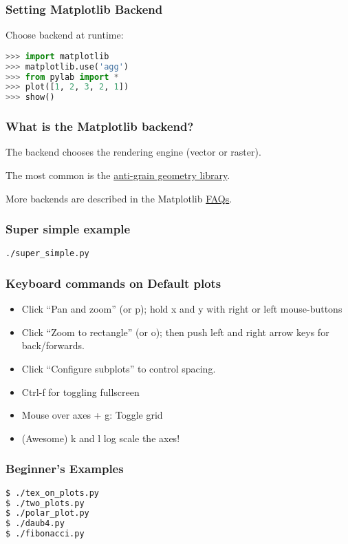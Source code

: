 \documentclass{beamer}
\begin{document}
\begin{frame}[fragile]
\frametitle{Setting Matplotlib Backend}
Choose backend at runtime:
\begin{lstlisting}[language=Python]
>>> import matplotlib
>>> matplotlib.use('agg')
>>> from pylab import *
>>> plot([1, 2, 3, 2, 1])
>>> show()
\end{lstlisting}
\end{frame}

\begin{frame}
\frametitle{What is the Matplotlib backend?}
The backend chooses the rendering engine (vector or raster).

The most common is the \href{http://agg.sourceforge.net/antigrain.com/index.html}{anti-grain geometry library}.

More backends are described in the Matplotlib \href{http://matplotlib.org/faq/usage_faq.html}{FAQs}.

\end{frame}

\begin{frame}
\frametitle{Super simple example}

\texttt{./super\_simple.py}

\end{frame}

\begin{frame}
\frametitle{Keyboard commands on Default plots}

\begin{itemize}

\item Click ``Pan and zoom'' (or p); hold x and y with right or left mouse-buttons
\item Click ``Zoom to rectangle'' (or o); then push left and right arrow keys for back/forwards.
\item Click ``Configure subplots'' to control spacing.
\item Ctrl-f for toggling fullscreen
\item Mouse over axes + g: Toggle grid
\item (Awesome) k and l log scale the axes!
\end{itemize}

\end{frame}


\begin{frame}[fragile]
\frametitle{Beginner's Examples}
\begin{lstlisting}[language=bash]
$ ./tex_on_plots.py
$ ./two_plots.py
$ ./polar_plot.py
$ ./daub4.py
$ ./fibonacci.py
\end{lstlisting}

\end{frame}
\end{document}
